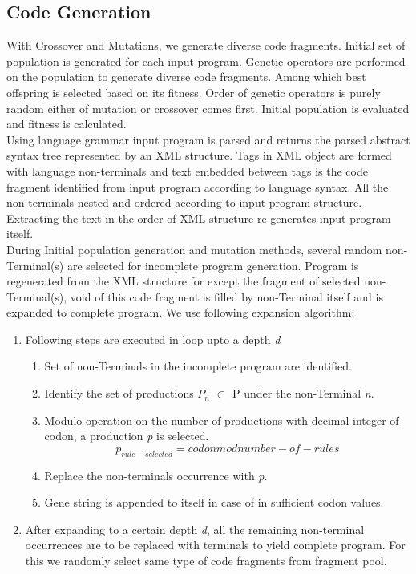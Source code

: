 \documentclass{sig-alternate}
\begin{document}
\subsection{Code Generation} \label{sec:cgen}
\indent With Crossover and Mutations, we generate diverse code fragments. Initial set of population is generated for each input program. Genetic operators are performed on the population to generate diverse code fragments. Among which best offspring is selected based on its fitness. Order of genetic operators is purely random either of mutation or crossover comes first. Initial population is evaluated and fitness is calculated. \\
\indent Using language grammar input program is parsed and returns the parsed abstract syntax tree represented by an XML structure. Tags in XML object are formed with language non-terminals and text embedded between tags is the code fragment identified from input program according to language syntax. All the non-terminals nested and ordered according to input program structure. Extracting the text in the order of XML structure re-generates input program itself. \\
\indent During Initial population generation and mutation methods, several random non-Terminal(s) are selected for incomplete program generation. Program is regenerated from the XML structure for except the fragment of selected non-Terminal(s), void of this code fragment is filled by non-Terminal itself and is expanded to complete program. We use following expansion algorithm:
\begin{enumerate}
\item Following steps are executed in loop     upto a depth \textit{d}
\begin{enumerate}
\item Set of non-Terminals in the incomplete program are identified.
\item Identify the set of productions $P_{n}$ $\subset$ P under the non-Terminal \textit{n}.
\item Modulo operation on the number of productions with decimal integer of codon, a production \textit{p} is selected. 
\[p_{rule-selected} = codon mod number-of-rules\]
\item Replace the non-terminals occurrence with \textit{p}.
\item Gene string is appended to itself in case of in sufficient codon values.
\end{enumerate}
\item After expanding to a certain depth \textit{d}, all the remaining non-terminal occurrences are to be replaced with terminals to yield complete program. For this we randomly select same type of code fragments from fragment pool.
\end{enumerate}
\end{document}
